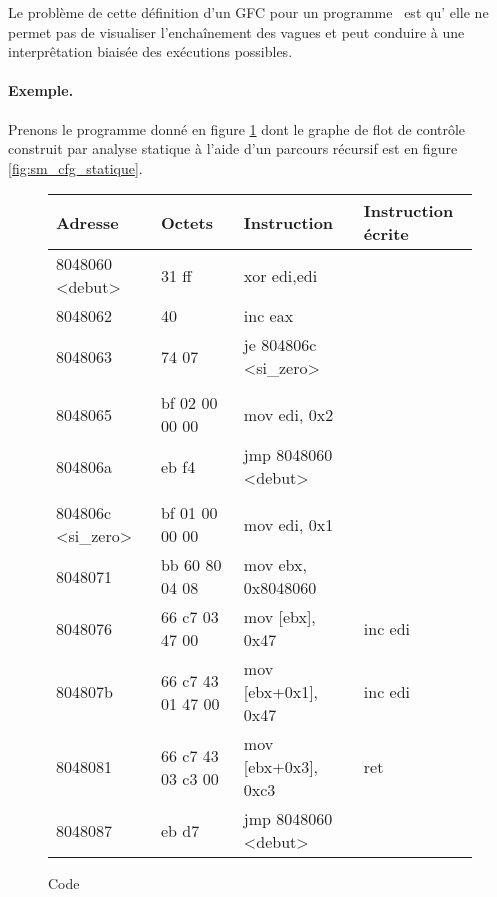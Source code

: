 Le problème de cette définition d'un GFC pour un programme \sm\ est qu'%
elle ne permet pas de visualiser l'enchaînement des vagues et peut conduire à une interprêtation biaisée des exécutions possibles.

\paragraph{Exemple.}
Prenons le programme donné en figure \ref{fig:sm_asm} dont le graphe de flot de contrôle construit par analyse statique à l'aide d'un parcours récursif est en figure \ref{fig:sm_cfg_statique}.

\begin{figure}[h]
\begin{center}
\begin{tabular}[b]{|l|l|l|l|}
\hline
Adresse & Octets & Instruction & Instruction écrite\\ 
\hline
 8048060 <debut>  &  31 ff             &  xor    edi,edi		& \\
 8048062  &  40                        &  inc    eax			& \\
 8048063  &  74 07                     &  je     804806c <si\_zero> 	& \\
 	  &			       &				& \\
 8048065  &  bf 02 00 00 00            &  mov    edi, 0x2 		& \\
 804806a  &  eb f4                     &  jmp    8048060 <debut> 	& \\
	  &			       &				& \\
 804806c <si\_zero> &  bf 01 00 00 00  &  mov    edi, 0x1 		& \\
 8048071  &  bb 60 80 04 08            &  mov    ebx, 0x8048060 	& \\
 8048076  &  66 c7 03 47 00            &  mov    [ebx], 0x47 		& inc edi\\
 804807b  &  66 c7 43 01 47 00         &  mov    [ebx+0x1], 0x47	& inc edi \\
 8048081  &  66 c7 43 03 c3 00         &  mov    [ebx+0x3], 0xc3	& ret \\
 8048087  &  eb d7                     &  jmp    8048060 <debut> 	& \\
\hline
\end{tabular}
\caption{Code \sm}
\label{fig:sm_asm}
\end{center}
\end{figure}

